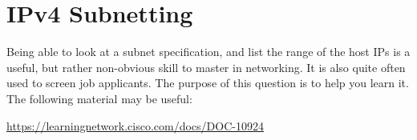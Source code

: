 \documentclass[9pt, addpoints]{exam}
\begin{document}
\section*{IPv4 Subnetting}
\begin{questions}
 \question
 \newpage
 \question
     Being able to look at a subnet specification, and list
     the range of the host IPs is a useful, but rather non-obvious
     skill to master in networking. It is also quite often used to screen
     job applicants. The purpose of this question
     is to help you learn it. The following material may be useful:
     
     \url{https://learningnetwork.cisco.com/docs/DOC-10924}
      
    \begin{parts}

\end{parts}
\end{questions}
\end{document}
